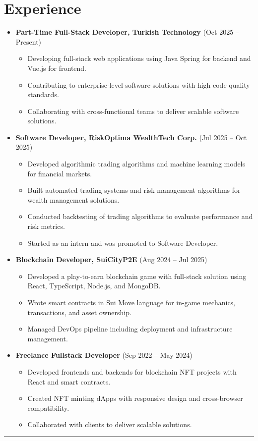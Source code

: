 \documentclass{article}
\begin{document}
\section*{Experience}
\vspace{-0.3em}
\begin{itemize}
    \item \textbf{Part-Time Full-Stack Developer, Turkish Technology} (Oct 2025 -- Present)
    \begin{itemize}
        \item Developing full-stack web applications using Java Spring for backend and Vue.js for frontend.
        \item Contributing to enterprise-level software solutions with high code quality standards.
        \item Collaborating with cross-functional teams to deliver scalable software solutions.
    \end{itemize}
    \item \textbf{Software Developer, RiskOptima WealthTech Corp.} (Jul 2025 -- Oct 2025)
    \begin{itemize}
        \item Developed algorithmic trading algorithms and machine learning models for financial markets.
        \item Built automated trading systems and risk management algorithms for wealth management solutions.
        \item Conducted backtesting of trading algorithms to evaluate performance and risk metrics.
        \item Started as an intern and was promoted to Software Developer.
    \end{itemize}
    \item \textbf{Blockchain Developer, SuiCityP2E} (Aug 2024 -- Jul 2025)
    \begin{itemize}
        \item Developed a play-to-earn blockchain game with full-stack solution using React, TypeScript, Node.js, and MongoDB.
        \item Wrote smart contracts in Sui Move language for in-game mechanics, transactions, and asset ownership.
        \item Managed DevOps pipeline including deployment and infrastructure management.
    \end{itemize}
    \item \textbf{Freelance Fullstack Developer} (Sep 2022 -- May 2024)
    \begin{itemize}
        \item Developed frontends and backends for blockchain NFT projects with React and smart contracts.
        \item Created NFT minting dApps with responsive design and cross-browser compatibility.
        \item Collaborated with clients to deliver scalable solutions.
    \end{itemize}
\end{itemize}
\hrule
\vspace{0.3em}
\end{document}
